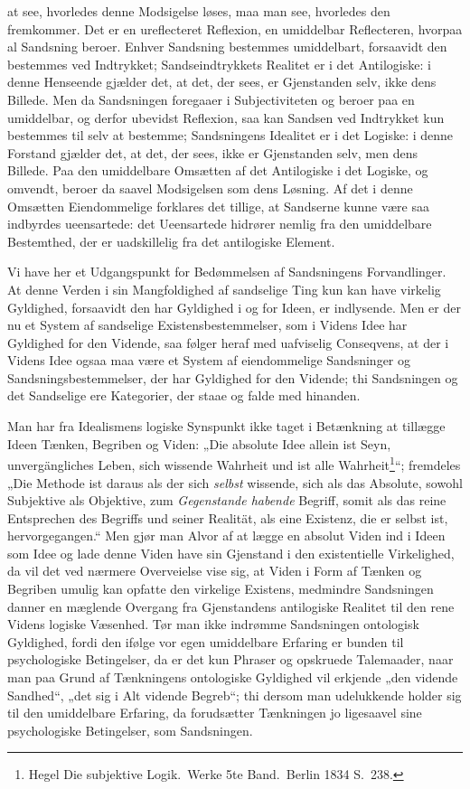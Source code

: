 \documentclass[12pt]{book}
\newcommand{\opage}[1]{\marginnote{\footnotesize\textit{[#1]}}}
\begin{document}
\opage{256} at see, hvorledes denne Modsigelse løses, maa man see, hvorledes den fremkommer. Det er en
ureflecteret Reflexion, en umiddelbar Reflecteren, hvorpaa al Sandsning beroer. Enhver Sandsning
bestemmes umiddelbart, forsaavidt den bestemmes ved Indtrykket; Sandseindtrykkets Realitet er i det
Antilogiske: i denne Henseende gjælder det, at det, der sees, er Gjenstanden selv, ikke dens Billede.
Men da Sandsningen foregaaer i Subjectiviteten og beroer paa en umiddelbar, og derfor ubevidst
Reflexion, saa kan Sandsen ved Indtrykket kun bestemmes til selv at bestemme; Sandsningens Idealitet
er i det Logiske: i denne Forstand gjælder det, at det, der sees, ikke er Gjenstanden selv, men dens
Billede. Paa den umiddelbare Omsætten af det Antilogiske i det Logiske, og omvendt, beroer da saavel
Modsigelsen som dens Løsning. Af det i denne Omsætten Eiendommelige forklares det tillige, at
Sandserne kunne være saa indbyrdes ueensartede: det Ueensartede hidrører nemlig fra den umiddelbare
Bestemthed, der er uadskillelig fra det antilogiske Element.

Vi have her et Udgangspunkt for Bedømmelsen af Sandsningens Forvandlinger. At denne Verden i sin
Mangfoldighed af sandselige Ting kun kan have virkelig Gyldighed, forsaavidt den har Gyldighed i og
for Ideen, er indlysende. Men er der nu et System af sandselige Existensbestemmelser, som i Videns
Idee har Gyldighed for den Vidende, saa følger heraf med uafviselig Conseqvens, at der i Videns Idee
ogsaa maa være et System af eiendommelige Sandsninger og Sandsningsbestemmelser, der har Gyldighed
for den Vidende; thi Sandsningen og det Sandselige ere Kategorier, der staae og falde med hinanden.

Man har fra Idealismens logiske Synspunkt ikke taget i Betænkning at tillægge Ideen Tænken, Begriben
og Viden: „Die absolute Idee allein ist Seyn, unvergängliches Leben, sich wissende Wahrheit und ist
alle Wahrheit\footnote{Hegel Die subjektive Logik.\ Werke 5te Band.\ Berlin 1834 S.~238.}“; fremdeles
„Die
\opage{257} Methode ist daraus als der sich \emph{selbst} wissende, sich als das Absolute, sowohl Subjektive als
Objektive, zum \emph{Gegenstande habende} Begriff, somit als das reine Entsprechen des Begriffs und
seiner Realität, als eine Existenz, die er selbst ist, hervorgegangen.“ Men gjør man Alvor af at
lægge en absolut Viden ind i Ideen som Idee og lade denne Viden have sin Gjenstand i den existentielle
Virkelighed, da vil det ved nærmere Overveielse vise sig, at Viden i Form af Tænken og Begriben umulig
kan opfatte den virkelige Existens, medmindre Sandsningen danner en mæglende Overgang fra Gjenstandens
antilogiske Realitet til den rene Videns logiske Væsenhed. Tør man ikke indrømme Sandsningen
ontologisk Gyldighed, fordi den ifølge vor egen umiddelbare Erfaring er bunden til psychologiske
Betingelser, da er det kun Phraser og opskruede Talemaader, naar man paa Grund af Tænkningens
ontologiske Gyldighed vil erkjende „den vidende Sandhed“, „det sig i Alt vidende Begreb“; thi dersom
man udelukkende holder sig til den umiddelbare Erfaring, da forudsætter Tænkningen jo ligesaavel sine
psychologiske Betingelser, som Sandsningen.
\end{document}
